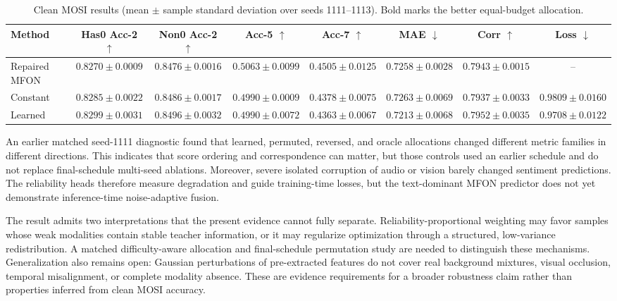 \documentclass{article}
\begin{document}
\begin{table}[t]
\caption{Clean MOSI results (mean $\pm$ sample standard deviation over seeds 1111--1113). Bold marks the better equal-budget allocation.}
\label{tab:main}
\centering
\footnotesize
\setlength{\tabcolsep}{3.2pt}
\begin{tabular}{lccccccc}
\toprule
Method & Has0 Acc-2 $\uparrow$ & Non0 Acc-2 $\uparrow$ & Acc-5 $\uparrow$ & Acc-7 $\uparrow$ & MAE $\downarrow$ & Corr $\uparrow$ & Loss $\downarrow$ \\
\midrule
Repaired MFON & $0.8270\pm0.0009$ & $0.8476\pm0.0016$ & $0.5063\pm0.0099$ & $0.4505\pm0.0125$ & $0.7258\pm0.0028$ & $0.7943\pm0.0015$ & -- \\
Constant & $0.8285\pm0.0022$ & $0.8486\pm0.0017$ & $0.4990\pm0.0009$ & \textbf{$0.4378\pm0.0075$} & $0.7263\pm0.0069$ & $0.7937\pm0.0033$ & $0.9809\pm0.0160$ \\
Learned & \textbf{$0.8299\pm0.0031$} & \textbf{$0.8496\pm0.0032$} & \textbf{$0.4990\pm0.0072$} & $0.4363\pm0.0067$ & \textbf{$0.7213\pm0.0068$} & \textbf{$0.7952\pm0.0035$} & \textbf{$0.9708\pm0.0122$} \\
\bottomrule
\end{tabular}
\end{table}

An earlier matched seed-1111 diagnostic found that learned, permuted, reversed, and oracle allocations changed different metric families in different directions. This indicates that score ordering and correspondence can matter, but those controls used an earlier schedule and do not replace final-schedule multi-seed ablations. Moreover, severe isolated corruption of audio or vision barely changed sentiment predictions. The reliability heads therefore measure degradation and guide training-time losses, but the text-dominant MFON predictor does not yet demonstrate inference-time noise-adaptive fusion.

The result admits two interpretations that the present evidence cannot fully separate. Reliability-proportional weighting may favor samples whose weak modalities contain stable teacher information, or it may regularize optimization through a structured, low-variance redistribution. A matched difficulty-aware allocation and final-schedule permutation study are needed to distinguish these mechanisms. Generalization also remains open: Gaussian perturbations of pre-extracted features do not cover real background mixtures, visual occlusion, temporal misalignment, or complete modality absence. These are evidence requirements for a broader robustness claim rather than properties inferred from clean MOSI accuracy.
\end{document}
